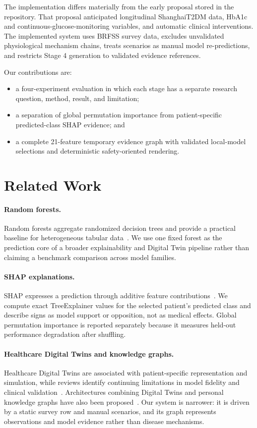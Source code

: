 \documentclass[11pt]{article}
\begin{document}
The implementation differs materially from the early proposal stored in the repository. That proposal anticipated longitudinal ShanghaiT2DM data, HbA1c and continuous-glucose-monitoring variables, and automatic clinical interventions. The implemented system uses BRFSS survey data, excludes unvalidated physiological mechanism chains, treats scenarios as manual model re-predictions, and restricts Stage 4 generation to validated evidence references.

Our contributions are:
\begin{itemize}[leftmargin=*]
  \item a four-experiment evaluation in which each stage has a separate research question, method, result, and limitation;
  \item a separation of global permutation importance from patient-specific predicted-class SHAP evidence; and
  \item a complete 21-feature temporary evidence graph with validated local-model selections and deterministic safety-oriented rendering.
\end{itemize}

\section{Related Work}

\paragraph{Random forests.}
Random forests aggregate randomized decision trees and provide a practical baseline for heterogeneous tabular data~\cite{breiman}. We use one fixed forest as the prediction core of a broader explainability and Digital Twin pipeline rather than claiming a benchmark comparison across model families.

\paragraph{SHAP explanations.}
SHAP expresses a prediction through additive feature contributions~\cite{lundberg}. We compute exact TreeExplainer values for the selected patient's predicted class and describe signs as model support or opposition, not as medical effects. Global permutation importance is reported separately because it measures held-out performance degradation after shuffling.

\paragraph{Healthcare Digital Twins and knowledge graphs.}
Healthcare Digital Twins are associated with patient-specific representation and simulation, while reviews identify continuing limitations in model fidelity and clinical validation~\cite{shen}. Architectures combining Digital Twins and personal knowledge graphs have also been proposed~\cite{connected}. Our system is narrower: it is driven by a static survey row and manual scenarios, and its graph represents observations and model evidence rather than disease mechanisms.
\end{document}
